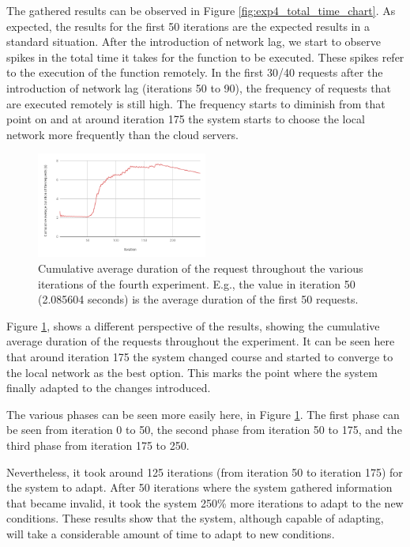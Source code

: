 \documentclass[conference]{IEEEtran}
\begin{document}
The gathered results can be observed in Figure \ref{fig:exp4_total_time_chart}. As
expected, the results for the first 50 iterations are the expected results in a
standard situation. After the introduction of network lag, we start to observe
spikes in the total time it takes for the function to be executed. These spikes
refer to the execution of the function remotely. In the first 30/40 requests after
the introduction of network lag (iterations 50 to 90), the frequency of requests
that are executed remotely is still high. The frequency starts to diminish
from that point on and at around iteration 175 the system starts to choose the
local network more frequently than the cloud servers.

\begin{figure}[h]
  \begin{center}
    \includegraphics[width=0.5\textwidth]{exp4_avg_chart.png}
    \caption{Cumulative average duration of the request throughout the various iterations of the fourth experiment. E.g., the value in iteration 50 (2.085604 seconds) is the average duration of the first 50 requests.}
    \label{fig:exp4_avg_chart}
  \end{center}
\end{figure}

Figure \ref{fig:exp4_avg_chart}, shows a different perspective of the results,
showing the cumulative average duration of the requests throughout the experiment.
It can be seen here that around iteration 175 the system changed course and
started to converge to the local network as the best option. This marks the point
where the system finally adapted to the changes introduced.

The various phases can be seen more easily here, in Figure
\ref{fig:exp4_avg_chart}. The first phase can be seen from iteration 0 to 50, the
second phase from iteration 50 to 175, and the third phase from iteration 175 to
250.

Nevertheless, it took around 125 iterations (from iteration 50 to iteration 175)
for the system to adapt. After 50 iterations where the system gathered information
that became invalid, it took the system 250\% more iterations to adapt to the new
conditions. These results show that the system, although capable of adapting, will
take a considerable amount of time to adapt to new conditions.
\end{document}
